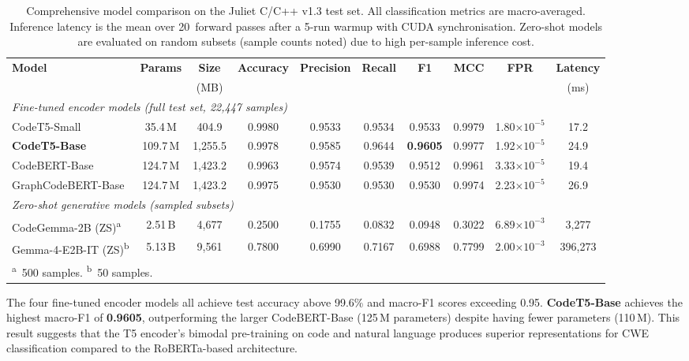 \documentclass[conference]{IEEEtran}
\begin{document}
\begin{table}[t]
\centering
\caption{Comprehensive model comparison on the Juliet C/C++ v1.3 test set.
         All classification metrics are macro-averaged.  Inference latency
         is the mean over 20~forward passes after a 5-run warmup with CUDA
         synchronisation.  Zero-shot models are evaluated on random subsets
         (sample counts noted) due to high per-sample inference cost.}
\label{tab:model_comparison}
\begin{tabular}{lccccccccc}
\hline
\textbf{Model} &
\textbf{Params} &
\textbf{Size} &
\textbf{Accuracy} &
\textbf{Precision} &
\textbf{Recall} &
\textbf{F1} &
\textbf{MCC} &
\textbf{FPR} &
\textbf{Latency} \\
& & (MB) & & & & & & & (ms) \\
\hline
\multicolumn{10}{l}{\textit{Fine-tuned encoder models (full test set, 22,447 samples)}} \\
\hline
CodeT5-Small        & 35.4\,M  & 404.9   & 0.9980 & 0.9533 & 0.9534 & 0.9533 & 0.9979 & 1.80$\times 10^{-5}$ & 17.2 \\
\textbf{CodeT5-Base}& 109.7\,M & 1,255.5 & 0.9978 & 0.9585 & 0.9644 & \textbf{0.9605} & 0.9977 & 1.92$\times 10^{-5}$ & 24.9 \\
CodeBERT-Base       & 124.7\,M & 1,423.2 & 0.9963 & 0.9574 & 0.9539 & 0.9512 & 0.9961 & 3.33$\times 10^{-5}$ & 19.4 \\
GraphCodeBERT-Base  & 124.7\,M & 1,423.2 & 0.9975 & 0.9530 & 0.9530 & 0.9530 & 0.9974 & 2.23$\times 10^{-5}$ & 26.9 \\
\hline
\multicolumn{10}{l}{\textit{Zero-shot generative models (sampled subsets)}} \\
\hline
CodeGemma-2B (ZS)\textsuperscript{a}    & 2.51\,B  & 4,677 & 0.2500 & 0.1755 & 0.0832 & 0.0948 & 0.3022 & 6.89$\times 10^{-3}$ & 3,277 \\
Gemma-4-E2B-IT (ZS)\textsuperscript{b}  & 5.13\,B  & 9,561 & 0.7800 & 0.6990 & 0.7167 & 0.6988 & 0.7799 & 2.00$\times 10^{-3}$ & 396,273 \\
\hline
\multicolumn{10}{l}{\footnotesize\textsuperscript{a}~500 samples. \textsuperscript{b}~50 samples.} \\
\end{tabular}
\end{table}

The four fine-tuned encoder models all achieve test accuracy above 99.6\%
and macro-F1 scores exceeding 0.95.  \textbf{CodeT5-Base} achieves the
highest macro-F1 of \textbf{0.9605}, outperforming the larger
CodeBERT-Base (125\,M parameters) despite having fewer parameters
(110\,M).  This result suggests that the T5 encoder's bimodal pre-training
on code and natural language produces superior representations for CWE
classification compared to the RoBERTa-based architecture.
\end{document}
